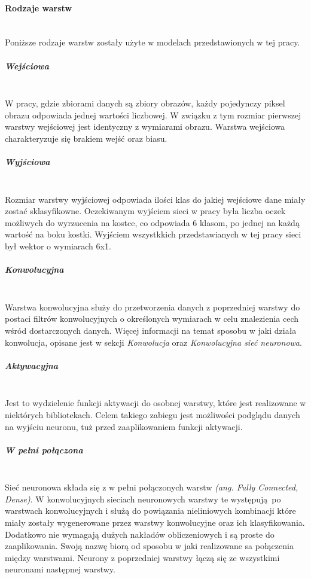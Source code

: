 \paragraph{Rodzaje warstw} \mbox{}\\
Poniższe rodzaje warstw zostały użyte w modelach przedstawionych w tej pracy.

\subparagraph{Wejściowa}  \mbox{}\\
W pracy, gdzie zbiorami danych są zbiory obrazów, każdy pojedynczy piksel obrazu
odpowiada jednej wartości liczbowej. W związku z tym rozmiar pierwszej warstwy
wejściowej jest identyczny z wymiarami obrazu. Warstwa wejściowa charakteryzuje się
brakiem wejść oraz biasu.

\subparagraph{Wyjściowa}  \mbox{}\\
Rozmiar warstwy wyjściowej odpowiada ilości klas do jakiej wejściowe dane miały
zostać sklasyfikowne. Oczekiwanym wyjściem sieci w pracy była liczba oczek możliwych
do wyrzucenia na kostce, co odpowiada 6 klasom, po jednej na każdą wartość na boku
kostki. Wyjściem wszystkkich przedstawianych w tej pracy sieci był wektor o wymiarach
6x1.

\subparagraph{Konwolucyjna}  \mbox{}\\
Warstwa konwolucyjna służy do przetworzenia danych z poprzedniej warstwy do postaci
filtrów konwolucyjnych o określonych wymiarach w celu znalezienia cech wśród dostarczonych
danych. Więcej informacji na temat sposobu w jaki działa konwolucja, opisane jest w sekcji
\textit{Konwolucja} oraz \textit{Konwolucyjna sieć neuronowa}.

\subparagraph{Aktywacyjna}  \mbox{}\\
Jest to wydzielenie funkcji aktywacji do osobnej warstwy, które jest realizowane
w niektórych bibliotekach. Celem takiego zabiegu jest możliwości podglądu danych
na wyjściu neuronu, tuż przed zaaplikowaniem funkcji aktywacji.

\subparagraph{W pełni połączona}  \mbox{}\\
Sieć neuronowa składa się z w pełni połączonych warstw \textit{(ang. Fully Connected, Dense)}.
W konwolucyjnych sieciach neuronowych warstwy te występują po warstwach konwolucyjnych
i służą do powiązania nieliniowych kombinacji które miały zostały wygenerowane przez
warstwy konwolucyjne oraz ich klasyfikowania. Dodatkowo nie wymagają dużych nakładów
obliczeniowych i są proste do zaaplikowania. Swoją nazwę biorą od sposobu w jaki
realizowane sa połączenia między warstwami. Neurony z poprzedniej warstwy łączą się ze
wszystkimi neuronami następnej warstwy.

